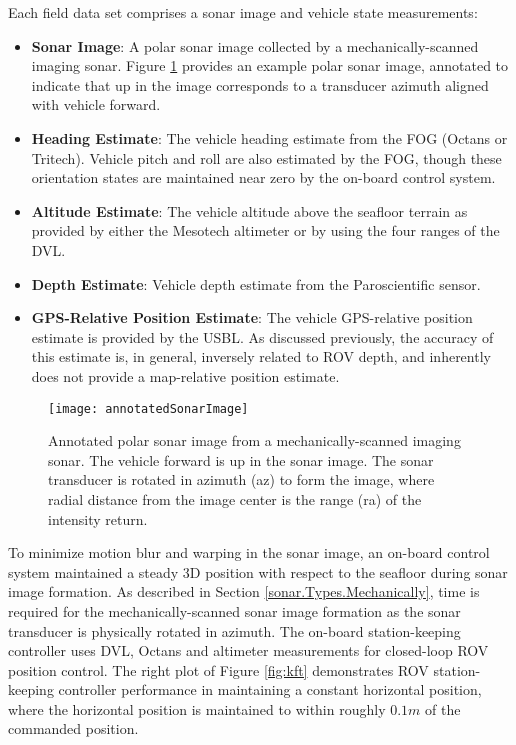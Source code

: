Each field data set comprises a sonar image and vehicle state measurements:

\begin{itemize}
\item \textbf{Sonar Image}: A polar sonar image collected by a mechanically-scanned imaging sonar.  Figure \ref{fig:rovSonarImage} provides an example polar sonar image, annotated to indicate that up in the image corresponds to a transducer azimuth aligned with vehicle forward.
\item \textbf{Heading Estimate}: The vehicle heading estimate from the FOG (Octans or Tritech). Vehicle pitch and roll are also estimated by the FOG, though these orientation states are maintained near zero by the on-board control system.
\item \textbf{Altitude Estimate}: The vehicle altitude above the seafloor terrain as provided by either the Mesotech altimeter or by using the four ranges of the DVL.
\item \textbf{Depth Estimate}: Vehicle depth estimate from the Paroscientific sensor.
\item \textbf{GPS-Relative Position Estimate}: The vehicle GPS-relative position estimate is provided by the USBL.  As discussed previously, the accuracy of this estimate is, in general, inversely related to ROV depth, and inherently does not provide a map-relative position estimate.
\end{itemize}

\begin{figure}[!h]
	\centering
		\texttt{[image: annotatedSonarImage]}
	\caption{Annotated polar sonar image from a mechanically-scanned imaging sonar. The vehicle forward is up in the sonar image.  The sonar transducer is rotated in azimuth (az) to form the image, where radial distance from the image center is the range (ra) of the intensity return.  }
	\label{fig:rovSonarImage}
\end{figure}

To minimize motion blur and warping in the sonar image, an on-board control system maintained a steady 3D position with respect to the seafloor during sonar image formation.
As described in Section \ref{sonar.Types.Mechanically}, time is required for the mechanically-scanned sonar image formation as the sonar transducer is physically rotated in azimuth.
The on-board station-keeping controller uses DVL, Octans and altimeter measurements for closed-loop ROV position control. 
The right plot of Figure \ref{fig:kft} demonstrates ROV station-keeping controller performance in maintaining a constant horizontal position, where the horizontal position is maintained to within roughly $0.1m$ of the commanded position.

